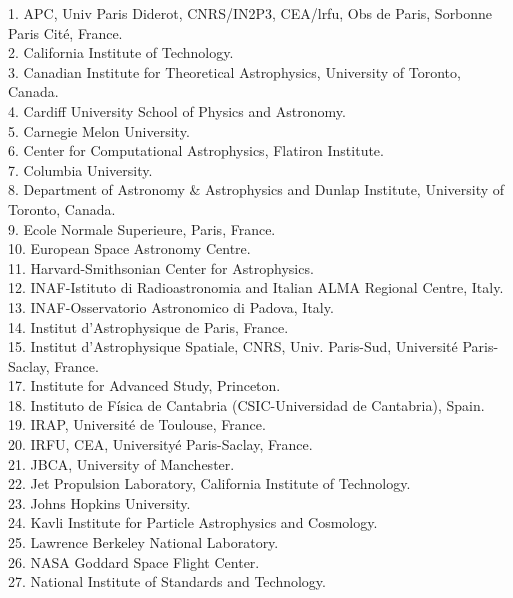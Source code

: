 \documentclass[PICOReport.tex]{subfiles}
\begin{document}
\begin{multicols}{2}
\raggedright 
\scriptsize {
1. APC, Univ Paris Diderot, CNRS/IN2P3, CEA/lrfu, Obs de Paris, Sorbonne Paris Cit\'e, France.  \\
2. California Institute of Technology.  \\
3. Canadian Institute for Theoretical Astrophysics, University of Toronto, Canada.  \\
4. Cardiff University School of Physics and Astronomy.  \\
5. Carnegie Melon University.  \\
6. Center for Computational Astrophysics, Flatiron Institute.  \\
7. Columbia University.  \\
8. Department of Astronomy \& Astrophysics and Dunlap Institute, University of Toronto, Canada.  \\
9. Ecole Normale Superieure, Paris, France.  \\
10. European Space Astronomy Centre.  \\
11. Harvard-Smithsonian Center for Astrophysics.  \\
12. INAF-Istituto di Radioastronomia and Italian ALMA Regional Centre, Italy.  \\
13. INAF-Osservatorio Astronomico di Padova, Italy.  \\
14. Institut d'Astrophysique de Paris, France.  \\
15. Institut d'Astrophysique Spatiale, CNRS, Univ. Paris-Sud, Universit\'e Paris-Saclay, France.  \\
17. Institute for Advanced Study, Princeton.  \\
18. Instituto de F\'isica de Cantabria (CSIC-Universidad de Cantabria), Spain.  \\
19. IRAP, Universit\'e de Toulouse, France.  \\
20. IRFU, CEA, University\'e Paris-Saclay, France.  \\
21. JBCA, University of Manchester.  \\
22. Jet Propulsion Laboratory, California Institute of Technology.  \\
23. Johns Hopkins University.  \\
24. Kavli Institute for Particle Astrophysics and Cosmology.  \\
25. Lawrence Berkeley National Laboratory.  \\
26. NASA Goddard Space Flight Center.  \\
27. National Institute of Standards and Technology.  \\
}
\end{multicols}
\end{document}
